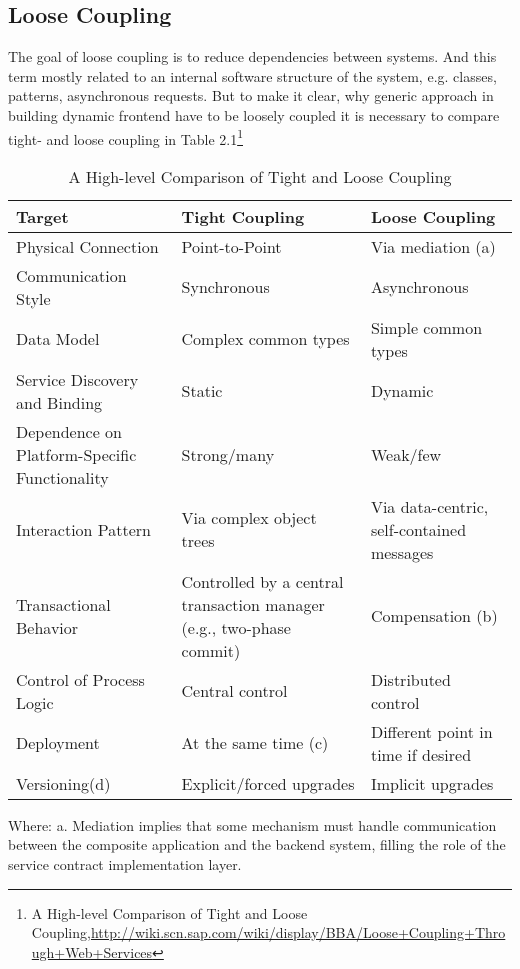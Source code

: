 \subsection {Loose Coupling}
The goal of loose coupling is to reduce dependencies between systems. And this term mostly related to an internal software structure of the system, e.g. classes, patterns, asynchronous requests. But to make it clear, why generic approach in building dynamic frontend have to be loosely coupled it is necessary to compare tight- and loose coupling in Table 2.1\footnote{A High-level Comparison of Tight and Loose Coupling,\url{http://wiki.scn.sap.com/wiki/display/BBA/Loose+Coupling+Through+Web+Services}}
\begin{table}[H]
	\centering
	\begin{tabular}{|L{3cm}|L{5cm}|l|}
	\hline
	Target 			      & \textbf{Tight Coupling} & \textbf{Loose Coupling} \\
	\hline
	\hline
	Physical Connection		         & Point-to-Point & Via mediation (a)  \\
	\hline
	Communication Style		         & Synchronous & Asynchronous  \\
	\hline
	Data Model		                 & Complex common types & Simple common types  \\
	\hline
	Service Discovery and Binding    & Static & Dynamic  \\
	\hline
	Dependence on Platform-Specific Functionality		& Strong/many & Weak/few  \\
	\hline
	Interaction Pattern		         & Via complex object trees & Via data-centric, self-contained messages  \\
	\hline
	Transactional Behavior		    & Controlled by a central transaction manager (e.g., two-phase commit) & Compensation (b)  \\
	\hline
	Control of Process Logic		& Central control & Distributed control  \\
	\hline
	Deployment	                    & At the same time (c) & Different point in time if desired  \\
	\hline 		
	Versioning(d) 		            & Explicit/forced upgrades & Implicit upgrades  \\
	\hline 
	\end{tabular}
	\caption[A High-level Comparison of Tight and Loose Coupling]{A High-level Comparison of Tight and Loose Coupling}
	\label{tab:loose_coupling}
	\end{table}
Where: 
\newline
a. Mediation implies that some mechanism must handle communication between the composite application and the backend system, filling the role of the service contract implementation layer.
